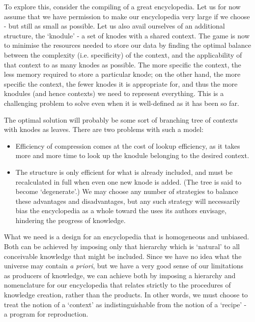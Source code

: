 \documentclass[a4paper,11pt,oneside]{book}
\begin{document}
To explore this, consider the compiling of a great encyclopedia. Let us for now assume that we have permission to make our encyclopedia very large if we choose - but still as small as possible. Let us also avail ourselves of an additional structure, the `knodule' - a set of knodes with a shared context. The game is now to minimise the resources needed to store our data by finding the optimal balance between the complexity (i.e. specificity) of the context, and the applicability of that context to as many knodes as possible. The more specific the context, the less memory required to store a particular knode; on the other hand, the more specific the context, the fewer knodes it is appropriate for, and thus the more knodules (and hence contexts) we need to represent everything. This is a challenging problem to solve even when it is well-defined as it has been so far.

The optimal solution will probably be some sort of branching tree of contexts with knodes as leaves. There are two problems with such a model:

\begin{itemize}
\item Efficiency of compression comes at the cost of lookup efficiency, as it takes more and more time to look up the knodule belonging to the desired context.
\item The structure is only efficient for what is already included, and must be recalculated in full when even one new knode is added. (The tree is said to become `degenerate'.)
We may choose any number of strategies to balance these advantages and disadvantages, but any such strategy will necessarily bias the encyclopedia as a whole toward the uses its authors envisage, hindering the progress of knowledge.
\end{itemize}

What we need is a design for an encyclopedia that is homogeneous and unbiased. Both can be achieved by imposing only that hierarchy which is `natural' to all conceivable knowledge that might be included. Since we have no idea what the universe may contain \textit{a priori}, but we have a very good sense of our limitations as producers of knowledge, we can achieve both by imposing a hierarchy and nomenclature for our encyclopedia that relates strictly to the procedures of knowledge creation, rather than the products. In other words, we must choose to treat the notion of a `context' as indistinguishable from the notion of a `recipe' - a program for reproduction.
\end{document}
